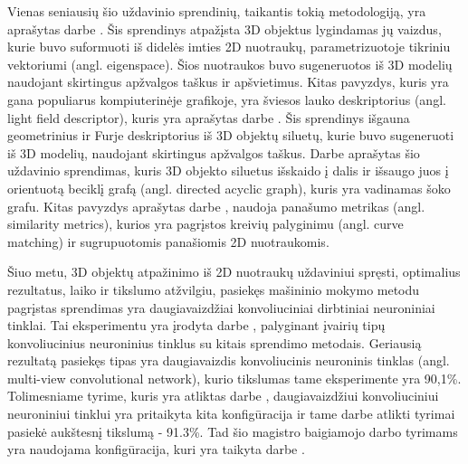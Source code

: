 Vienas seniausių šio uždavinio sprendinių, taikantis tokią metodologiją, yra aprašytas darbe \cite{prevWparEig}. Šis sprendinys atpažįsta 3D objektus lygindamas jų vaizdus, kurie buvo suformuoti iš didelės imties 2D nuotraukų, parametrizuotoje tikriniu vektoriumi (angl. eigenspace). Šios nuotraukos buvo sugeneruotos iš 3D modelių naudojant skirtingus apžvalgos taškus ir apšvietimus. Kitas pavyzdys, kuris yra gana populiarus kompiuterinėje grafikoje, yra šviesos lauko deskriptorius (angl. light field descriptor), kuris yra aprašytas darbe \cite{prevWLightFld}. Šis sprendinys išgauna geometrinius ir Furje deskriptorius iš 3D objektų siluetų, kurie buvo sugeneruoti iš 3D modelių, naudojant skirtingus apžvalgos taškus. Darbe \cite{prevWShockGraph} aprašytas šio uždavinio sprendimas, kuris 3D objekto siluetus išskaido į dalis ir išsaugo juos į orientuotą beciklį grafą (angl. directed acyclic graph), kuris yra vadinamas šoko grafu. Kitas pavyzdys aprašytas darbe \cite{prevWSimMet}, naudoja panašumo metrikas (angl. similarity metrics), kurios yra pagrįstos kreivių palyginimu (angl. curve matching) ir sugrupuotomis panašiomis 2D nuotraukomis.

Šiuo metu, 3D objektų atpažinimo iš 2D nuotraukų uždaviniui spręsti, optimalius rezultatus, laiko ir tikslumo atžvilgiu, pasiekęs mašininio mokymo metodu pagrįstas sprendimas yra daugiavaizdžiai konvoliuciniai dirbtiniai neuroniniai tinklai. Tai eksperimentu yra įrodyta darbe \cite{cnnExp1}, palyginant įvairių tipų konvoliucinius neuroninius tinklus su kitais sprendimo metodais. Geriausią rezultatą pasiekęs tipas yra daugiavaizdis konvoliucinis neuroninis tinklas (angl. multi-view convolutional network), kurio tikslumas tame eksperimente yra 90,1\%. Tolimesniame tyrime, kuris yra atliktas darbe \cite{cnnExp2}, daugiavaizdžiui konvoliuciniui neuroniniui tinklui yra pritaikyta kita konfigūracija ir tame darbe atlikti tyrimai pasiekė aukštesnį tikslumą - 91.3\%. Tad šio magistro baigiamojo darbo tyrimams yra naudojama konfigūracija, kuri yra taikyta darbe \cite{cnnExp2}.